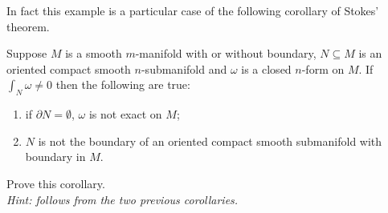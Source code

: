 In fact this example is a particular case of the following corollary of Stokes' theorem.

\begin{corollary}
	Suppose $M$ is a smooth $m$-manifold with or without boundary, $N\subseteq M$ is an oriented compact smooth $n$-submanifold and $\omega$ is a closed $n$-form on $M$.
	If $\int_N\omega \neq 0$ then the following are true:
	\begin{enumerate}
		\item if $\partial N = \emptyset$, $\omega$ is not exact on $M$;
		\item $N$ is not the boundary of an oriented compact smooth submanifold with boundary in $M$.
	\end{enumerate}
\end{corollary}
\begin{exercise}
	Prove this corollary. \\
	\textit{\small Hint: follows from the two previous corollaries.}
\end{exercise}


